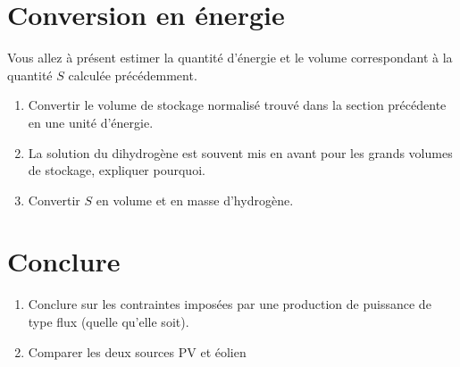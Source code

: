 \documentclass[12pt,a4,french]{article}
\begin{document}
\section{Conversion en énergie}

Vous allez à présent estimer la quantité d'énergie et le volume correspondant à la quantité $S$ calculée précédemment. 

\begin{enumerate}
	\item Convertir le volume de stockage normalisé trouvé dans la section précédente en une unité d'énergie.
	\item La solution du dihydrogène est souvent mis en avant pour les grands volumes de stockage, expliquer pourquoi.
	\item Convertir $S$ en volume et en masse d'hydrogène.
\end{enumerate}


\section{Conclure}
\begin{enumerate}
	\item Conclure sur les contraintes imposées par une production de puissance de type flux (quelle qu'elle soit). 
	
	\item Comparer les deux  sources PV et éolien
\end{enumerate}
\end{document}
